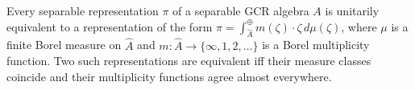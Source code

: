 Every separable representation $\pi$ of a separable GCR algebra $A$ is unitarily equivalent to a representation of the form $\pi = \int^{\oplus}_{\hat{A}} m(\zeta) \cdot \zeta \, d\mu(\zeta)$, where $\mu$ is a finite Borel measure on $\hat{A}$ and $m: \hat{A} \to \{\infty, 1, 2, \ldots\}$ is a Borel multiplicity function. Two such representations are equivalent iff their measure classes coincide and their multiplicity functions agree almost everywhere.
